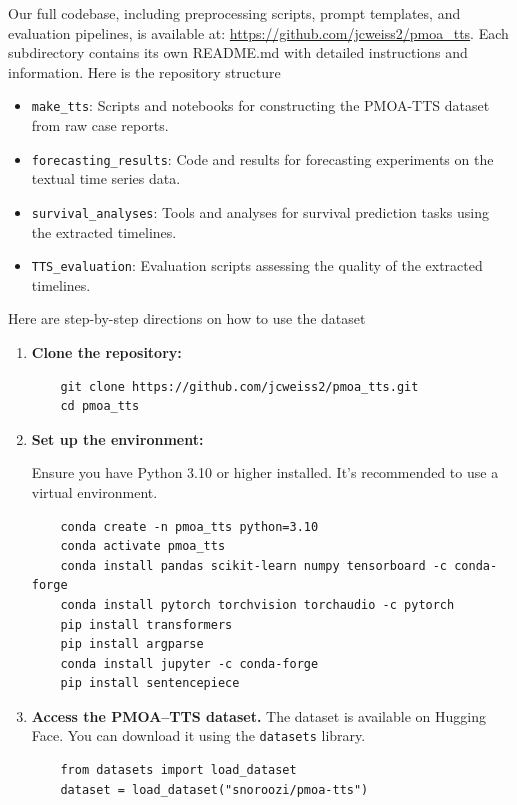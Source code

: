 Our full codebase, including preprocessing scripts, prompt templates, and evaluation pipelines,
is available at: \url{https://github.com/jcweiss2/pmoa_tts}. Each subdirectory contains its own README.md with detailed instructions and information. Here is the repository structure
\begin{itemize}
    \item \texttt{make\_tts}: Scripts and notebooks for constructing the PMOA-TTS dataset from raw case reports.
    \item \texttt{forecasting\_results}: Code and results for forecasting experiments on the textual time series data.
    \item \texttt{survival\_analyses}: Tools and analyses for survival prediction tasks using the extracted timelines.
    \item \texttt{TTS\_evaluation}: Evaluation scripts assessing the quality of the extracted timelines.
\end{itemize}

\noindent Here are step-by-step directions on how to use the dataset

\begin{enumerate}

\item \textbf{Clone the repository:}

{\small
\begin{verbatim}
    git clone https://github.com/jcweiss2/pmoa_tts.git
    cd pmoa_tts
\end{verbatim}
}

\item \textbf{Set up the environment:}

\noindent Ensure you have Python 3.10 or higher installed. It's recommended to use a virtual environment.

{\small
\begin{verbatim}
    conda create -n pmoa_tts python=3.10
    conda activate pmoa_tts
    conda install pandas scikit-learn numpy tensorboard -c conda-forge
    conda install pytorch torchvision torchaudio -c pytorch
    pip install transformers
    pip install argparse
    conda install jupyter -c conda-forge
    pip install sentencepiece
\end{verbatim}
}

\item \textbf{Access the PMOA--TTS dataset.} The dataset is available on Hugging Face. You can download it using the \texttt{datasets} library.

{\small
\begin{verbatim}
    from datasets import load_dataset
    dataset = load_dataset("snoroozi/pmoa-tts")
\end{verbatim}
}

\end{enumerate}

